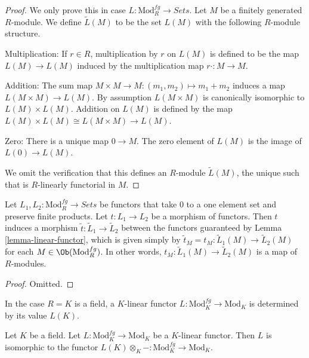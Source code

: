 \begin{proof}
We only prove this in case $L: \text{Mod}^{fg}_R \to \textit{Sets}$.
Let $M$ be a finitely generated $R$-module. We define $\widetilde{L}(M)$ to be
the set $L(M)$ with the following $R$-module structure.

\medskip\noindent
Multiplication: If $r \in R$, multiplication by $r$ on $L(M)$ is defined to be
the map $L(M) \to L(M)$ induced by the multiplication map
$r \cdot : M \to M$.

\medskip\noindent
Addition: The sum map $M \times M \to M: (m_1, m_2) \mapsto m_1 + m_2$
induces a map $L(M \times M) \to L(M)$. By assumption $L(M \times M)$
is canonically isomorphic to $L(M) \times L(M)$.  Addition on $L(M)$ is defined
by the map $L(M) \times L(M) \cong L(M \times M) \to L(M)$.

\medskip\noindent
Zero: There is a unique map $0 \to M$. The zero element of $L(M)$ is
the image of $L(0) \to L(M)$.

\medskip\noindent
We omit the verification that this defines an $R$-module $\widetilde{L}(M)$,
the unique such that is $R$-linearly functorial in $M$.
\end{proof}

\begin{lemma}
\label{lemma-morphism-linear-functors}
Let $L_1, L_2: \text{Mod}^{fg}_R \to \textit{Sets}$ be
functors that take $0$ to a one element set and preserve finite products.
Let $t : L_1 \to L_2$ be a morphism of functors. Then $t$ induces a morphism
$\widetilde{t} : \widetilde{L}_1 \to \widetilde{L}_2$ between the
functors guaranteed by Lemma \ref{lemma-linear-functor}, which is given simply
by $\widetilde{t}_M = t_M: \widetilde{L}_1(M) \to \widetilde{L}_2(M)$
for each $M \in \Ob(\text{Mod}^{fg}_R)$. In other words,
$t_M: \widetilde{L}_1(M) \to \widetilde{L}_2(M)$ is a map of $R$-modules.
\end{lemma}

\begin{proof}
Omitted.
\end{proof}

\noindent
In the case $R = K$ is a field, a $K$-linear functor
$L : \text{Mod}^{fg}_K \to \text{Mod}_K$ is determined by its value $L(K)$.

\begin{lemma}
\label{lemma-linear-functor-over-field}
Let $K$ be a field. Let $L: \text{Mod}^{fg}_K \to
\text{Mod}_K$ be a $K$-linear functor.  Then $L$ is isomorphic to the
functor $L(K) \otimes_K - : \text{Mod}^{fg}_K \to
\text{Mod}_K$.
\end{lemma}

